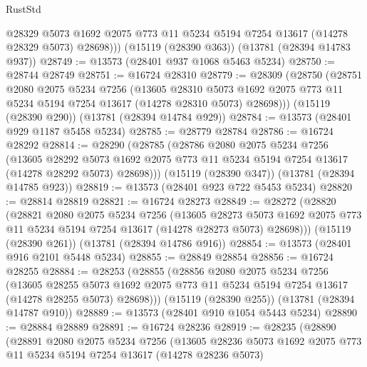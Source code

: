 \begin{lexlean}{RustStd}
\begin{coremodule}
          @28329
          @5073
          @1692
          @2075
          @773
          @11
          @5234
          @5194
          @7254
          @13617
          (@14278 @28329 @5073)
          @28698)))
    (@15119 (@28390 @363))
    (@13781 (@28394 @14783 @937))
@28749 := @13573 (@28401 @937 @1068 @5463 @5234)
@28750 := @28744 @28749
@28751 := @16724 @28310
@28779 := @28309
    (@28750
      (@28751
        @2080
        @2075
        @5234
        @7256
        (@13605
          @28310
          @5073
          @1692
          @2075
          @773
          @11
          @5234
          @5194
          @7254
          @13617
          (@14278 @28310 @5073)
          @28698)))
    (@15119 (@28390 @290))
    (@13781 (@28394 @14784 @929))
@28784 := @13573 (@28401 @929 @1187 @5458 @5234)
@28785 := @28779 @28784
@28786 := @16724 @28292
@28814 := @28290
    (@28785
      (@28786
        @2080
        @2075
        @5234
        @7256
        (@13605
          @28292
          @5073
          @1692
          @2075
          @773
          @11
          @5234
          @5194
          @7254
          @13617
          (@14278 @28292 @5073)
          @28698)))
    (@15119 (@28390 @347))
    (@13781 (@28394 @14785 @923))
@28819 := @13573 (@28401 @923 @722 @5453 @5234)
@28820 := @28814 @28819
@28821 := @16724 @28273
@28849 := @28272
    (@28820
      (@28821
        @2080
        @2075
        @5234
        @7256
        (@13605
          @28273
          @5073
          @1692
          @2075
          @773
          @11
          @5234
          @5194
          @7254
          @13617
          (@14278 @28273 @5073)
          @28698)))
    (@15119 (@28390 @261))
    (@13781 (@28394 @14786 @916))
@28854 := @13573 (@28401 @916 @2101 @5448 @5234)
@28855 := @28849 @28854
@28856 := @16724 @28255
@28884 := @28253
    (@28855
      (@28856
        @2080
        @2075
        @5234
        @7256
        (@13605
          @28255
          @5073
          @1692
          @2075
          @773
          @11
          @5234
          @5194
          @7254
          @13617
          (@14278 @28255 @5073)
          @28698)))
    (@15119 (@28390 @255))
    (@13781 (@28394 @14787 @910))
@28889 := @13573 (@28401 @910 @1054 @5443 @5234)
@28890 := @28884 @28889
@28891 := @16724 @28236
@28919 := @28235
    (@28890
      (@28891
        @2080
        @2075
        @5234
        @7256
        (@13605
          @28236
          @5073
          @1692
          @2075
          @773
          @11
          @5234
          @5194
          @7254
          @13617
          (@14278 @28236 @5073)

\end{coremodule}
\end{lexlean}
